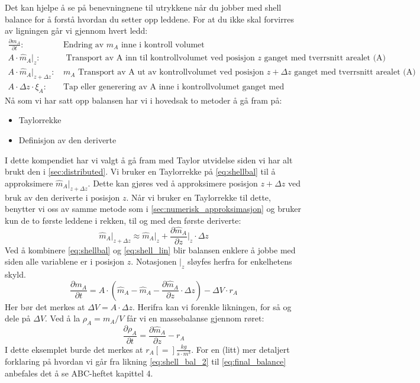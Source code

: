    Det kan hjelpe å se på benevningnene til utrykkene når du jobber med shell balance for å forstå hvordan du setter opp leddene. For at du ikke skal forvirres av ligningen går vi gjennom hvert ledd:
\begin{align*}
     \frac{\partial m_A}{\partial t}:&\, \text{Endring av }m_A\text{ inne i kontroll volumet}\\
     A \cdot \hat{m}_A\big|_z:&\, \text{ Transport av A inn til kontrollvolumet ved posisjon }z\text{ ganget med tverrsnitt arealet (A)} \\
     A \cdot \hat{m}_A\big|_{z+\Delta z}:&\, m_A \text{ Transport av A ut av kontrollvolumet ved posisjon }z+\Delta z \text{ ganget med tverrsnitt arealet (A)} \\
     A\cdot \Delta z \cdot \xi_A:&\, \text{Tap eller generering av A inne i kontrollvolumet ganget med volumet av unit cellen} 
\end{align*}
Nå som vi har satt opp balansen har vi i hovedsak to metoder å gå fram på:
\begin{itemize}
    \item Taylorrekke
    \item Definisjon av den deriverte
\end{itemize}
I dette kompendiet har vi valgt å gå fram med Taylor utvidelse siden vi har alt brukt den i \cref{sec:distributed}. Vi bruker en Taylorrekke på \cref{eq:shellbal} til å approksimere $\hat{m}_A\big|_{z+\Delta z}$. Dette kan gjøres ved å approksimere posisjon $z+\Delta z$ ved bruk av den deriverte i posisjon $z$. Når vi bruker en Taylorrekke til dette, benytter vi oss av samme metode som i \cref{sec:numerisk_approksimasjon} og bruker kun de to første leddene i rekken, til og med den første deriverte:
\begin{equation}
    \label{eq:shell_lin}
    \hat{m}_A\big|_{z+\Delta z} \approx \hat{m}_A\big|_z + \frac{\partial \hat{m}_A}{\partial z}\Big|_z \cdot \Delta z
\end{equation}
Ved å kombinere \cref{eq:shellbal} og \cref{eq:shell_lin} blir balansen enklere å jobbe med siden alle variablene er i posisjon $z$. Notasjonen $\big|_z$ sløyfes herfra for enkelhetens skyld. 
\begin{equation}
    \label{eq:shell_bal_2}
    \frac{\partial m_A}{\partial t} = A \cdot \left(\hat{m}_A - \hat{m}_A - \frac{\partial \hat{m}_A}{\partial z} \cdot \Delta z \right) - \Delta V \cdot r_A
\end{equation}
Her bør det merkes at $\Delta V = A \cdot \Delta z$. Herifra kan vi forenkle likningen, for så og dele på $\Delta V$. Ved å la $\rho_A = m_A/V$ får vi en massebalanse gjennom røret:
\begin{equation}
    \label{eq:final_balance}
    \frac{\partial \rho_A}{\partial t} = \frac{\partial \hat{m}_A}{\partial z} - r_A
\end{equation}
I dette eksemplet burde det merkes at $r_A [=] \frac{kg}{s \cdot m^3}$. For en (litt) mer detaljert forklaring på hvordan vi går fra likning \ref{eq:shell_bal_2} til \ref{eq:final_balance} anbefales det å se ABC-heftet kapittel 4.